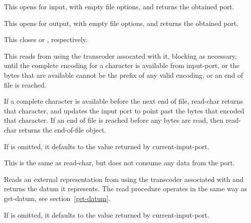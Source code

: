 \begin{entry}{%
}

This opens  for input, with empty file options, and returns
the obtained port.
\end{entry}

\begin{entry}{%
}

This opens  for output, with empty file options, and
returns the obtained port.
\end{entry}

\begin{entry}{%
}

This closes  or , respectively.
\end{entry}

\begin{entry}{%
}

This reads from  using the transcoder assocated with
it, blocking as necessary, until the complete encoding for a character
is available from input-port, or the bytes that are available cannot
be the prefix of any valid encoding, or an end of file is reached.

If a complete character is available before the next end of file, {\cf
  read-char} returns that character, and updates the input port to
point past the bytes that encoded that character. If an end of file is
reached before any bytes are read, then {\cf read-char} returns the
end-of-file object.

If  is omitted, it defaults to the value returned by
{\cf current-input-port}.
\end{entry}

\begin{entry}{%
}
   
This is the same as {\cf read-char}, but does not consume any data
from the port.
\end{entry}

\begin{entry}{%
}

Reads an external representation from  using the
transcoder associated with  and returns the datum it
represents.  The {\cf read} procedure operates in the same way as 
{\cf get-datum}, see section~\ref{get-datum}.

If  is omitted, it defaults to the value returned by
{\cf current-input-port}.
\end{entry}

